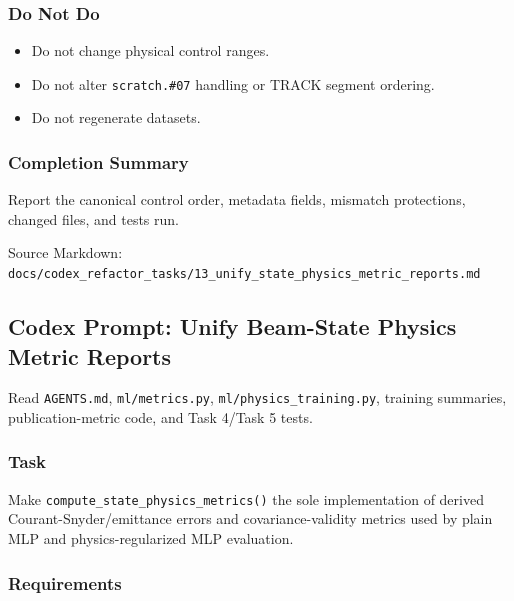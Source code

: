 \documentclass[
]{article}
\providecommand{\tightlist}{%
  \setlength{\itemsep}{0pt}\setlength{\parskip}{0pt}}
\begin{document}
\hypertarget{do-not-do-1}{%
\subsubsection{Do Not Do}\label{do-not-do-1}}

\begin{itemize}
\tightlist
\item
  Do not change physical control ranges.
\item
  Do not alter \texttt{scratch.\#07} handling or TRACK segment ordering.
\item
  Do not regenerate datasets.
\end{itemize}

\hypertarget{completion-summary-1}{%
\subsubsection{Completion Summary}\label{completion-summary-1}}

Report the canonical control order, metadata fields, mismatch
protections, changed files, and tests run.

Source Markdown:
\texttt{docs/codex\_refactor\_tasks/13\_unify\_state\_physics\_metric\_reports.md}

\hypertarget{codex-prompt-unify-beam-state-physics-metric-reports}{%
\subsection{Codex Prompt: Unify Beam-State Physics Metric
Reports}\label{codex-prompt-unify-beam-state-physics-metric-reports}}

Read \texttt{AGENTS.md}, \texttt{ml/metrics.py},
\texttt{ml/physics\_training.py}, training summaries, publication-metric
code, and Task 4/Task 5 tests.

\hypertarget{task-12}{%
\subsubsection{Task}\label{task-12}}

Make \texttt{compute\_state\_physics\_metrics()} the sole implementation
of derived Courant-Snyder/emittance errors and covariance-validity
metrics used by plain MLP and physics-regularized MLP evaluation.

\hypertarget{requirements-12}{%
\subsubsection{Requirements}\label{requirements-12}}
\end{document}
